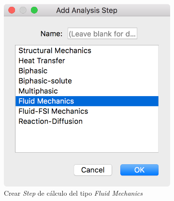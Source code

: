 \begin{figure}[!ht]
\centering
\begin{subfigure}[b]{0.225\textwidth}
\centering
\includegraphics[width=\linewidth]{figuras_4/06_pre_step-0.png}
\caption{Crear \emph{Step} de cálculo del tipo \emph{Fluid Mechanics}}
\label{fig:pre-06-a}
\end{subfigure}
\hfil
\begin{subfigure}[b]{0.25\textwidth}

\end{subfigure}
\end{figure}
